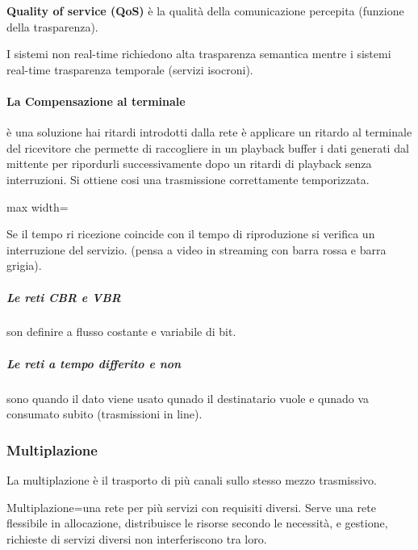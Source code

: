 \textbf{Quality of service (QoS)} è la qualità della comunicazione percepita (funzione della trasparenza).

I sistemi non real-time richiedono alta trasparenza semantica mentre i sistemi real-time trasparenza temporale (servizi isocroni).
\paragraph{La Compensazione al terminale} è una soluzione hai ritardi introdotti dalla rete è applicare un ritardo al terminale del ricevitore che permette di raccogliere in un playback buffer i dati generati dal mittente per ripordurli successivamente dopo un ritardi di playback senza interruzioni.
Si ottiene cosi una trasmissione correttamente temporizzata.

\medskip
\begin{adjustbox}{max width=\textwidth}
\end{adjustbox}

\medskip
Se il tempo ri ricezione coincide con il tempo di riproduzione si verifica un interruzione del servizio. (pensa a video in streaming con barra rossa e barra grigia).
\subparagraph{Le reti CBR e VBR} son definire a flusso costante e variabile di bit.
\subparagraph{Le reti a tempo differito e non} sono quando il dato viene usato qunado il destinatario vuole e qunado va consumato subito (trasmissioni in line).
\subsubsection{Multiplazione}
La multiplazione è il trasporto di più canali sullo stesso mezzo trasmissivo.

Multiplazione=una rete per più servizi con requisiti diversi. Serve una rete flessibile in allocazione, distribuisce le risorse secondo le necessità, e gestione, richieste di servizi diversi non interferiscono tra loro.

